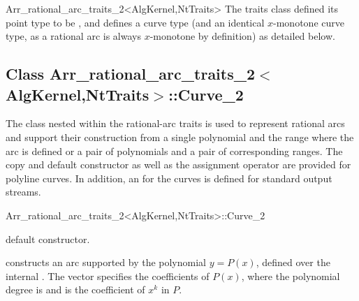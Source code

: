 \begin{ccRefClass}{Arr_rational_arc_traits_2<AlgKernel,NtTraits>}
The traits class defined its point type to be ,
and defines a curve type (and an identical $x$-monotone curve type, as 
a rational arc is always $x$-monotone by definition) as detailed below.


\ccIsModel

\subsection*{Class
         Arr\_rational\_arc\_traits\_2$<$AlgKernel,NtTraits$>$::Curve\_2}

The  class nested within the rational-arc traits is used
to represent rational arcs and support their construction from a
single polynomial and the range where the arc is defined or a pair of
polynomials and a pair of corresponding ranges. The copy and default
constructor as well as the assignment operator are provided for
polyline curves. In addition, an  for the curves is
defined for standard output streams.

\begin{ccClass}{Arr_rational_arc_traits_2<AlgKernel,NtTraits>::Curve_2}

\ccTypes



\ccCreation
{}

  {default constructor.}

  {constructs an arc supported by the polynomial $y = P(x)$, defined over
   the internal . The vector  specifies
   the coefficients of $P(x)$, where the polynomial degree is
    and  is the coefficient of $x^k$ in $P$.
   }


\end{ccClass}
\end{ccRefClass}
